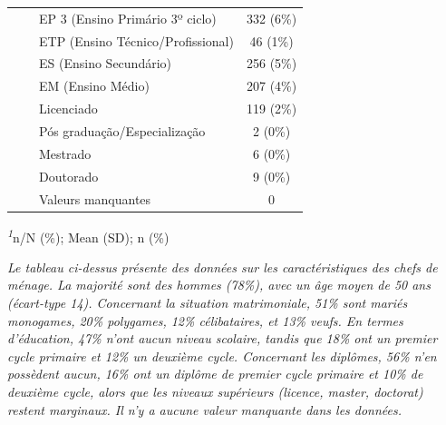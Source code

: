 \documentclass[
]{article}
\begin{document}
\begin{table}[!t]
\begin{tabular*}{\linewidth}{@{\extracolsep{\fill}}lc}
    EP 3 (Ensino Primário 3º ciclo) & 332 (6\%) \\ 
    ETP (Ensino Técnico/Profissional) & 46 (1\%) \\ 
    ES (Ensino Secundário) & 256 (5\%) \\ 
    EM (Ensino Médio) & 207 (4\%) \\ 
    Licenciado & 119 (2\%) \\ 
    Pós graduação/Especialização & 2 (0\%) \\ 
    Mestrado & 6 (0\%) \\ 
    Doutorado & 9 (0\%) \\ 
    Valeurs manquantes & 0 \\ 
\bottomrule
\end{tabular*}
\begin{minipage}{\linewidth}
\textsuperscript{\textit{1}}n/N (\%); Mean (SD); n (\%)\\
\end{minipage}
\end{table}

\emph{Le tableau ci-dessus présente des données sur les caractéristiques
des chefs de ménage. La majorité sont des hommes (78\%), avec un âge
moyen de 50 ans (écart-type 14). Concernant la situation matrimoniale,
51\% sont mariés monogames, 20\% polygames, 12\% célibataires, et 13\%
veufs. En termes d'éducation, 47\% n'ont aucun niveau scolaire, tandis
que 18\% ont un premier cycle primaire et 12\% un deuxième cycle.
Concernant les diplômes, 56\% n'en possèdent aucun, 16\% ont un diplôme
de premier cycle primaire et 10\% de deuxième cycle, alors que les
niveaux supérieurs (licence, master, doctorat) restent marginaux. Il n'y
a aucune valeur manquante dans les données.}
\end{document}
